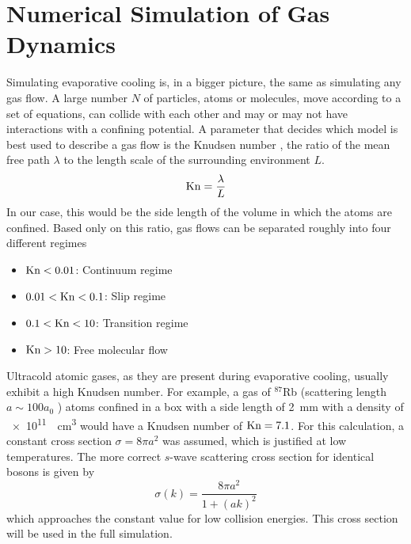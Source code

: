 \section{Numerical Simulation of Gas Dynamics}
\label{sec:dsmc_theory}

Simulating evaporative cooling is, in a bigger picture, the same as simulating any gas flow. A large number $N$ of particles, atoms or molecules, move according to a set of equations, can collide with each other and may or may not have interactions with a confining potential. A parameter that decides which model is best used to describe a gas flow is the Knudsen number \Kn, the ratio of the mean free path $\lambda$ to the length scale of the surrounding environment $L$.
\begin{equation*}
    \text{Kn} = \frac{\lambda}{L}
\end{equation*}
In our case, this would be the side length of the volume in which the atoms are confined. Based only on this ratio, gas flows can be separated roughly into four different regimes \cite{schaaf:1958}
\begin{itemize}
    \item $\text{Kn} < \num{.01}$: Continuum regime
    \item $\num{.01} < \text{Kn} < \num{.1}$: Slip regime
    \item $\num{.1} < \text{Kn} < \num{10}$: Transition regime
    \item $\text{Kn} > 10$: Free molecular flow
\end{itemize}
Ultracold atomic gases, as they are present during evaporative cooling, usually exhibit a high Knudsen number. For example, a gas of $^{87}$Rb (scattering length $a\sim 100 a_0$ \cite{PhysRevA.87.053614}) atoms confined in a box with a side length of \SI{2}{mm} with a density of \SI{e11}{\per\centi\meter\cubed} would have a Knudsen number of $\text{Kn} = \num{7.1}$. For this calculation, a constant cross section $\sigma = 8\pi a^2$ was assumed, which is justified at low temperatures. The more correct $s$-wave scattering cross section for identical bosons is given by \cite{dalibardCollision}
\begin{equation}  \label{eq:crosssection}
    \sigma(k) = \frac{8\pi a^2}{1 + (ak)^2} 
\end{equation}
which approaches the constant value for low collision energies. This cross section will be used in the full simulation.

